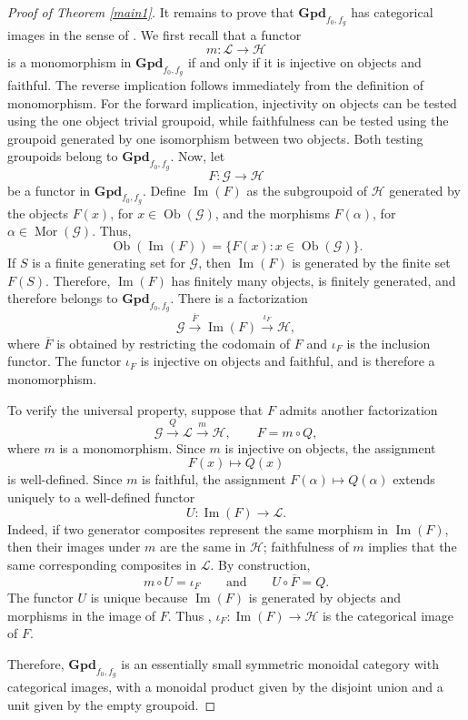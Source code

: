 \documentclass{amsart}
\begin{document}
\begin{proof}[Proof of Theorem \ref{main1}]
It remains to prove that $\mathbf{Gpd}_{f_0,f_g}$ has categorical images in the sense of \cite[Section~2]{patel2016generalized}. We first recall that a functor
\[
m\colon\mathcal{L}\to\mathcal{H}
\]
is a monomorphism in $\mathbf{Gpd}_{f_0,f_g}$ if and only if it is injective on objects and faithful. The reverse implication follows immediately from the definition of monomorphism. For the forward implication, injectivity on objects can be tested using the one object trivial groupoid, while faithfulness can be tested using the groupoid generated by one isomorphism between two objects. Both testing groupoids belong to $\mathbf{Gpd}_{f_0,f_g}$. Now, let
\[
F\colon\mathcal{G}\longrightarrow\mathcal{H}
\]
be a functor in $\mathbf{Gpd}_{f_0,f_g}$. Define $\operatorname{Im}(F)$ as the subgroupoid of $\mathcal{H}$ generated by the objects $F(x)$, for $x\in\operatorname{Ob}(\mathcal{G})$, and the morphisms $F(\alpha)$, for $\alpha\in\operatorname{Mor}(\mathcal{G})$. Thus,
\[
\operatorname{Ob}(\operatorname{Im}(F))
=
\{F(x):x\in\operatorname{Ob}(\mathcal{G})\}.
\]
If $S$ is a finite generating set for $\mathcal{G}$, then
$\operatorname{Im}(F)$ is generated by the finite set $F(S)$.
Therefore, $\operatorname{Im}(F)$ has finitely many objects, is
finitely generated, and therefore belongs to $\mathbf{Gpd}_{f_0,f_g}$. There is a factorization
\[
\mathcal{G}
\xrightarrow{\overline{F}}
\operatorname{Im}(F)
\xrightarrow{\iota_F}
\mathcal{H},
\]
where $\overline{F}$ is obtained by restricting the codomain of $F$ and $\iota_F$ is the inclusion functor. The functor $\iota_F$ is injective on objects and faithful, and is therefore a monomorphism.

To verify the universal property, suppose that $F$ admits another
factorization
\[
\mathcal{G}
\xrightarrow{Q}
\mathcal{L}
\xrightarrow{m}
\mathcal{H},
\qquad
F=m\circ Q,
\]
where $m$ is a monomorphism. Since $m$ is injective on objects, the
assignment
\[
F(x)\longmapsto Q(x)
\]
is well-defined. Since $m$ is faithful, the assignment
$F(\alpha)\longmapsto Q(\alpha)$
extends uniquely to a well-defined functor
\[
U\colon\operatorname{Im}(F)\longrightarrow\mathcal{L}.
\]
Indeed, if two generator composites represent the same morphism in
$\operatorname{Im}(F)$, then their images under $m$ are the same in
$\mathcal{H}$; faithfulness of $m$ implies that the same corresponding
composites in $\mathcal{L}$. By construction,
\[
m\circ U=\iota_F
\qquad\text{and}\qquad
U\circ\overline{F}=Q.
\]
The functor $U$ is unique because $\operatorname{Im}(F)$ is generated
by objects and morphisms in the image of $F$. Thus
, $\iota_F\colon\operatorname{Im}(F)\to\mathcal{H}$ is the categorical image of $F$.

Therefore, $\mathbf{Gpd}_{f_0,f_g}$ is an essentially small symmetric
monoidal category with categorical images, with a monoidal product given by the disjoint union and a unit given by the empty groupoid.
\end{proof}
\end{document}
